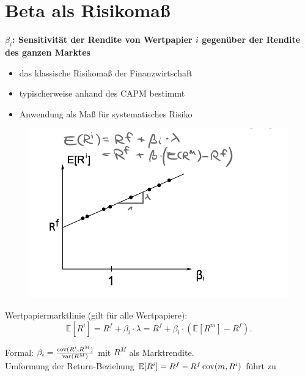 \documentclass[12pt]{extreport} %
\theoremstyle{named}
\theoremstyle{nnamed}
\theoremstyle{itshape}
\theoremstyle{normal}
\begin{document}
\section{Beta als Risikomaß}

\textbf{$\beta_i$: Sensitivität der Rendite von Wertpapier $i$ gegenüber der Rendite des ganzen Marktes}
\begin{itemize}
	\item das klassische Risikomaß der Finanzwirtschaft
	\item typischerweise anhand des CAPM  bestimmt
	\item Anwendung als Maß für systematisches Risiko
\end{itemize}
 
\begin{figure}[h!] \centering
	\includegraphics[scale=0.4]{img/p45}
\end{figure}
Wertpapiermarktlinie (gilt für alle Wertpapiere):
$$ \mathbb{E} \left[ R^i \right] = R^f + \beta_i \cdot \lambda = R^f + \beta_i \cdot \left( \mathbb{E}\left[R^m \right] - R^f \right). $$

Formal: $\beta_i = \frac{\operatorname{cov}(R^i, R^M)}{\operatorname{var}(R^M)}$ mit $R^M$ als Marktrendite. ~\\

Umformung der Return-Beziehung $\mathbb{E}[R^i] = R^f - R^f \operatorname{cov}(m, R^i)$ führt zu
\end{document}
